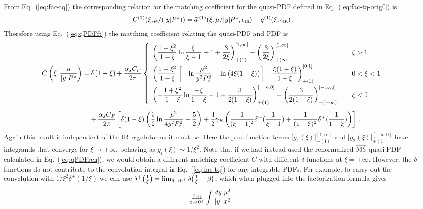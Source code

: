 \documentclass[prd,aps,twocolumn,preprintnumbers,showpacs,nofootinbib,superscriptaddress,notitlepage]{revtex4-1}
\newcommand{\beq}{\begin{eqnarray}}
\newcommand{\eeq}{\end{eqnarray}}
\newcommand{\nn}{\nonumber}
\DeclareRobustCommand{\eq}[1]{Eq.~(\ref{eq:#1})}
\begin{document}
\begin{widetext}
From \eq{fac-tq} the corresponding relation for the matching coefficient for the quasi-PDF defined in Eq.~(\ref{eq:fac-tq-orig0}) is
\beq \label{eq:quasiC}
C^{(1)}(\xi,\mu/(|y|P^z))= \tilde q'^{(1)}(\xi,\mu/|y|P^z,\epsilon_{\mbox{\tiny IR}})-q^{(1)}(\xi,\epsilon_{\mbox{\tiny IR}})\,.
\eeq
Therefore using \eq{qPDFft} the matching coefficient relating the quasi-PDF and PDF is
\begin{align} \label{eq:quasi-c}
C\left(\xi, {\mu\over |y| P^z}\right)
 = &\, \delta\left(1-\xi\right)+{\alpha_sC_F\over 2\pi}\left\{
	\begin{array}{ll}
	\displaystyle \left({1+\xi^2\over 1-\xi}\ln {\xi\over \xi-1} + 1 + {3\over 2\xi}\right)^{[1,\infty]}_{+(1)}- \left({3\over 2\xi}\right)^{[1,\infty]}_{+(\infty)}
    &\, \xi>1
    \nn\\[10pt]
	\displaystyle \left({1+\xi^2\over 1-\xi}\left[
     - \ln{\mu^2\over y^2P_z^2} + \ln\big(4\xi(1-\xi)\big)\right] - {\xi(1+\xi)\over 1-\xi}\right)^{[0,1]}_{+(1)}
    &\, 0<\xi<1
    \nn\\[10pt]
	\displaystyle  \left(-{1+\xi^2\over 1-\xi}\ln {-\xi\over 1-\xi} - 1 + {3\over 2(1-\xi)}\right)^{[-\infty,0]}_{+(1)} - \left({3\over 2(1-\xi)}\right)^{[-\infty,0]}_{+(-\infty)} \quad
    &\, \xi<0
	\end{array}\right.\nn\\[5pt]
	& + {\alpha_sC_F\over 2\pi}\left[\delta(1-\xi) \left( {3\over2}\ln{\mu^2\over 4y^2P_z^2} + {5\over2}\right) + {3\over2}\gamma_E\left({1\over(\xi-1)^2}\delta^+({1\over \xi-1}) + {1\over(1-\xi)^2}\delta^+({1\over 1-\xi})\right)\right]\,.
\end{align}
Again this result is independent of the IR regulator as it must be. Here the plus function terms $\big[ g_1(\xi) \big]_{+(1)}^{[1,\infty]}$ and $\big[ g_2(\xi) \big]_{+(1)}^{[-\infty,0]}$ have integrands that converge for $\xi\to \pm \infty$, behaving as $g_i(\xi)\sim 1/\xi^2$.  Note that if we had instead used the renormalized $\overline{\rm MS}$ quasi-PDF calculated in Eq.~(\ref{eq:qPDFren}), we would obtain a different matching coefficient $C$ with different $\delta$-functions at $\xi=\pm\infty$. However, the $\delta$-functions do not contribute to the convolution integral in Eq.~(\ref{eq:fac-tq}) for any integrable PDFs. For example, to carry out the convolution with $1/\xi^2 \delta^+(1/\xi)$ we can use $\delta^+\big({1\over \xi}\big)  = \lim_{\beta\to0^+}  \delta\big({1\over \xi} - \beta\big)$, which
when plugged into the factorization formula gives
\begin{align}
&\lim_{\beta\to0^+}\int {dy\over |y|} {y^2\over x^2}

\end{align}
\end{widetext}
\end{document}

